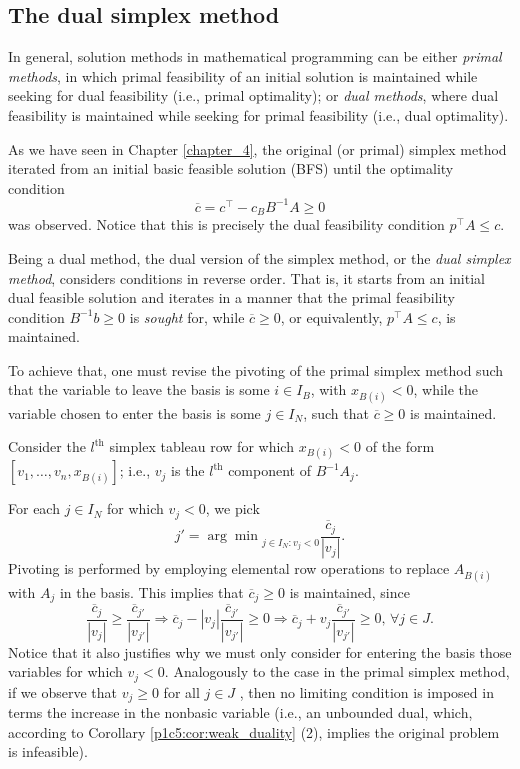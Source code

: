 \subsection{The dual simplex method}

In general, solution methods in mathematical programming can be either \emph{primal methods}, in which primal feasibility of an initial solution is maintained while seeking for dual feasibility (i.e., primal optimality); or \emph{dual methods}, where dual feasibility is maintained while seeking for primal feasibility (i.e., dual optimality).

As we have seen in Chapter \ref{chapter_4}, the original (or primal) simplex method iterated from an initial basic feasible solution (BFS) until the optimality condition 
%
\begin{equation*}
	\overline{c} = c^\top - c_BB^{-1}A \geq 0
\end{equation*}
%
was observed. Notice that this is precisely the dual feasibility condition $p^\top A \leq c$. 

Being a dual method, the dual version of the simplex method, or the \emph{dual simplex method}, considers conditions in reverse order. That is, it starts from an initial dual feasible solution and iterates in a manner that the primal feasibility condition $B^{-1}b \geq 0$ is \emph{sought} for, while $\overline{c} \geq 0$, or equivalently, $p^\top A \leq c$, is maintained.

To achieve that, one must revise the pivoting of the primal simplex method such that the variable to leave the basis is some $i \in I_B$, with $x_{B(i)} < 0$, while the variable chosen to enter the basis is some $j \in I_N$, such that $\overline{c} \geq 0$ is maintained.

 Consider the $l^\text{th}$ simplex tableau row for which $x_{B(i)} < 0$ of the form $[v_1,\dots, v_n, x_{B(i)}]$; i.e., $v_j$ is the $l^\text{th}$ component of $B^{-1}A_j$.
	 
 For each $j \in I_N$ for which $v_j < 0$, we pick
 \begin{equation*}
 	j' = {\arg\min}_{j \in I_N : v_j < 0} \frac{\overline{c}_j}{|v_j|}.	
 \end{equation*}
 Pivoting is performed by employing elemental row operations to replace $A_{B(i)}$ with $A_j$ in the basis. This implies that $\overline{c}_j \geq 0$ is maintained, since
 \begin{equation*}
	\frac{\overline{c}_j}{|v_j|} \geq \frac{\overline{c}_{j'}}{|v_{j'}|} \Rightarrow \overline{c}_j -|v_j|\frac{\overline{c}_{j'}}{|v_{j'}|} \geq 0 \Rightarrow \overline{c}_j + v_j\frac{\overline{c}_{j'}}{|v_{j'}|} \geq 0, \, \forall j \in J.
 \end{equation*}
%
Notice that it also justifies why we must only consider for entering the basis those variables for which $v_j < 0$. Analogously to the case in the primal simplex method, if we observe that $v_j \ge 0$ for all $j \in J$ , then no limiting condition is imposed in terms the increase in the nonbasic variable (i.e., an unbounded dual, which, according to Corollary \ref{p1c5:cor:weak_duality} (2), implies the original problem is infeasible).

